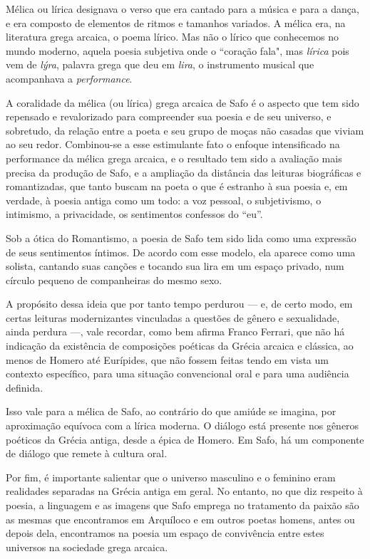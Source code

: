 \documentclass[12pt]{extarticle}
\begin{document}
Mélica ou lírica designava o verso que era cantado para a música e para a 
dança, e era composto de elementos de ritmos e tamanhos variados. A mélica era, 
na literatura grega arcaica, o poema lírico. Mas não o lírico que conhecemos no
mundo moderno, aquela poesia subjetiva onde o ``coração fala", mas \emph{lírica}
pois vem de \textit{lýra}, palavra grega que deu em \emph{lira}, o instrumento musical
que acompanhava a \textit{performance}.

A coralidade da mélica (ou lírica) grega arcaica de Safo é o aspecto que tem sido 
repensado e revalorizado para compreender sua poesia e de seu universo, e sobretudo, 
da relação entre a poeta e seu grupo de moças não casadas que viviam ao seu redor.
Combinou-se a esse estimulante fato o enfoque intensificado na performance da mélica 
grega arcaica, e o resultado tem sido a avaliação mais precisa da produção de Safo, 
e a ampliação da distância das leituras biográficas e romantizadas, que tanto 
buscam na poeta o que é estranho à sua poesia e, em verdade, à poesia antiga como 
um todo: a voz pessoal, o subjetivismo, o intimismo, a privacidade, os sentimentos 
confessos do ``eu''. 

Sob a ótica do Romantismo, a poesia de Safo tem sido lida como uma expressão de 
seus sentimentos íntimos. De acordo com esse modelo, ela aparece como uma solista, 
cantando suas canções e tocando sua lira em um espaço privado, num círculo 
pequeno de companheiras do mesmo sexo.

A propósito dessa ideia que por tanto tempo perdurou --- e, de certo modo, em
certas leituras modernizantes vinculadas a questões de gênero e sexualidade, 
ainda perdura ---, vale recordar, como bem afirma Franco Ferrari, que não há 
indicação da existência de composições poéticas da Grécia arcaica e clássica, 
ao menos de Homero até Eurípides, que não fossem feitas tendo em vista um 
contexto específico, para uma situação convencional oral e para uma audiência definida. 

Isso vale para a mélica de Safo, ao contrário do que amiúde se imagina, por 
aproximação equívoca com a lírica moderna. O diálogo está presente nos gêneros 
poéticos da Grécia antiga, desde a épica de Homero. Em Safo, há um componente 
de diálogo que remete à cultura oral.
 
Por fim, é importante salientar que o universo masculino e o feminino eram 
realidades separadas na Grécia antiga em geral. No entanto, no que diz respeito
à poesia, a linguagem e as imagens que Safo emprega no tratamento da paixão 
são as mesmas que encontramos em Arquíloco e em outros poetas homens, antes 
ou depois dela, encontramos na poesia um espaço de convivência entre estes
universos na sociedade grega arcaica.
\end{document}
